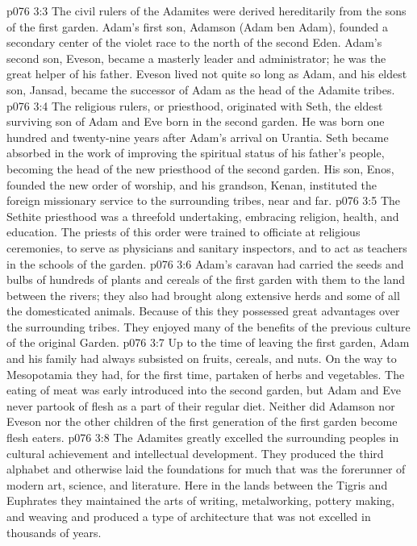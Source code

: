 \pc \vs p076 3:3 The civil rulers of the Adamites were derived hereditarily from the sons of the first garden. Adam’s first son, Adamson (Adam ben Adam), founded a secondary center of the violet race to the north of the second Eden. Adam’s second son, Eveson, became a masterly leader and administrator; he was the great helper of his father. Eveson lived not quite so long as Adam, and his eldest son, Jansad, became the successor of Adam as the head of the Adamite tribes.
\pc \vs p076 3:4 The religious rulers, or priesthood, originated with Seth, the eldest surviving son of Adam and Eve born in the second garden. He was born one hundred and twenty\hyp{}nine years after Adam’s arrival on Urantia. Seth became absorbed in the work of improving the spiritual status of his father’s people, becoming the head of the new priesthood of the second garden. His son, Enos, founded the new order of worship, and his grandson, Kenan, instituted the foreign missionary service to the surrounding tribes, near and far.
\vs p076 3:5 The Sethite priesthood was a threefold undertaking, embracing religion, health, and education. The priests of this order were trained to officiate at religious ceremonies, to serve as physicians and sanitary inspectors, and to act as teachers in the schools of the garden.
\pc \vs p076 3:6 Adam’s caravan had carried the seeds and bulbs of hundreds of plants and cereals of the first garden with them to the land between the rivers; they also had brought along extensive herds and some of all the domesticated animals. Because of this they possessed great advantages over the surrounding tribes. They enjoyed many of the benefits of the previous culture of the original Garden.
\vs p076 3:7 Up to the time of leaving the first garden, Adam and his family had always subsisted on fruits, cereals, and nuts. On the way to Mesopotamia they had, for the first time, partaken of herbs and vegetables. The eating of meat was early introduced into the second garden, but Adam and Eve never partook of flesh as a part of their regular diet. Neither did Adamson nor Eveson nor the other children of the first generation of the first garden become flesh eaters.
\pc \vs p076 3:8 The Adamites greatly excelled the surrounding peoples in cultural achievement and intellectual development. They produced the third alphabet and otherwise laid the foundations for much that was the forerunner of modern art, science, and literature. Here in the lands between the Tigris and Euphrates they maintained the arts of writing, metalworking, pottery making, and weaving and produced a type of architecture that was not excelled in thousands of years.\plusone
